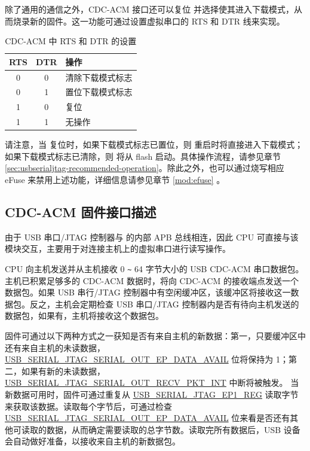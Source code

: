 \documentclass[main\_\_CN.tex]{subfiles}
\begin{document}
除了通用的通信之外，CDC-ACM 接口还可以复位 \chipname{} 并选择使其进入下载模式，从而烧录新的固件。这一功能可通过设置虚拟串口的 RTS 和 DTR 线来实现。

\begin{table}[H]
\centering
\caption{CDC-ACM 中 RTS 和 DTR 的设置}
\label{tab:usbserialjtag-cdc-acm-settings-with-rts-and-dtr}

\begin{tabular}{ | c | c | p{5cm} | }\hline
\rowcolor{lightgray}
\textbf{RTS} & \textbf{DTR} & \textbf{操作}\\\hline

0 & 0 & 清除下载模式标志 \\\hline
0 & 1 & 置位下载模式标志  \\\hline
1 & 0 & 复位 \chipname{}  \\\hline
1 & 1 & 无操作 \\\hline
\end{tabular}
\end{table}

请注意，当 \chipname{} 复位时，如果下载模式标志已置位，则 \chipname{} 重启时将直接进入下载模式；如果下载模式标志已清除，则 \chipname{} 将从 flash 启动。具体操作流程，请参见章节 \ref{sec:usbserialjtag-recommended-operation}。除此之外，也可以通过烧写相应 eFuse 来禁用上述功能，详细信息请参见章节 \ref{mod:efuse} \textit{}。

\subsection{CDC-ACM 固件接口描述}

由于 USB 串口/JTAG 控制器与 \chipname{} 的内部 APB 总线相连，因此 CPU 可直接与该模块交互，主要用于对连接主机上的虚拟串口进行读写操作。

CPU 向主机发送并从主机接收 0 \verb+~+ 64 字节大小的 USB CDC-ACM 串口数据包。主机已积累足够多的 CDC-ACM 数据时，将向 CDC-ACM 的接收端点发送一个数据包。如果 USB 串行/JTAG 控制器中有空闲缓冲区，该缓冲区将接收这一数据包。反之，主机会定期检查 USB 串口/JTAG 控制器内是否有待向主机发送的数据包，如果有，主机将接收这个数据包。

固件可通过以下两种方式之一获知是否有来自主机的新数据：第一，只要缓冲区中还有来自主机的未读数据，\hyperref[fielddesc:USBSERIALJTAGSERIALOUTEPDATAAVAIL]{USB\_SERIAL\_JTAG\_SERIAL\_OUT\_EP\_DATA\_AVAIL} 位将保持为 1；第二，如果有新的未读数据，\\\hyperref[fielddesc:USBSERIALJTAGSERIALOUTRECVPKTINTRAW]{USB\_SERIAL\_JTAG\_SERIAL\_OUT\_RECV\_PKT\_INT} 中断将被触发。 当新数据可用时，固件可通过重复从 \hyperref[fielddesc:USBSERIALJTAGRDWRBYTE]{USB\_SERIAL\_JTAG\_EP1\_REG} 读取字节来获取该数据。读取每个字节后，可通过检查 \hyperref[fielddesc:USBSERIALJTAGSERIALOUTEPDATAAVAIL]{USB\_SERIAL\_JTAG\_SERIAL\_OUT\_EP\_DATA\_AVAIL} 位来看是否还有其他可读取的数据，从而确定需要读取的总字节数。读取完所有数据后，USB 设备会自动做好准备，以接收来自主机的新数据包。
\end{document}
